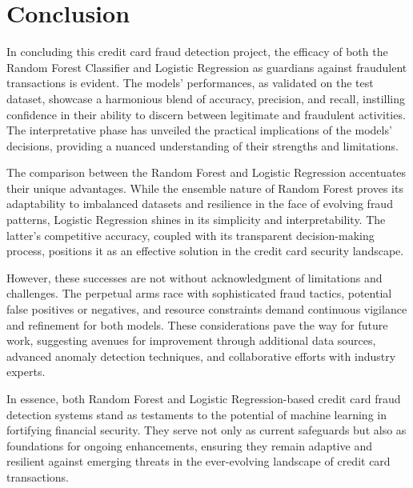 \let\cleardoublepage\clearpage
\chapter{Conclusion} %

\label{Chapter6} %

\newcommand{\keyword}[1]{\textbf{#1}}
\newcommand{\tabhead}[1]{\textbf{#1}}
\newcommand{\code}[1]{\texttt{#1}}
\newcommand{\file}[1]{\texttt{\bfseries#1}}
\newcommand{\option}[1]{\texttt{\itshape#1}}

In concluding this credit card fraud detection project, the efficacy of both the Random Forest Classifier and Logistic Regression as guardians against fraudulent transactions is evident. The models' performances, as validated on the test dataset, showcase a harmonious blend of accuracy, precision, and recall, instilling confidence in their ability to discern between legitimate and fraudulent activities. The interpretative phase has unveiled the practical implications of the models' decisions, providing a nuanced understanding of their strengths and limitations.\medskip

The comparison between the Random Forest and Logistic Regression accentuates their unique advantages. While the ensemble nature of Random Forest proves its adaptability to imbalanced datasets and resilience in the face of evolving fraud patterns, Logistic Regression shines in its simplicity and interpretability. The latter's competitive accuracy, coupled with its transparent decision-making process, positions it as an effective solution in the credit card security landscape.\medskip

However, these successes are not without acknowledgment of limitations and challenges. The perpetual arms race with sophisticated fraud tactics, potential false positives or negatives, and resource constraints demand continuous vigilance and refinement for both models. These considerations pave the way for future work, suggesting avenues for improvement through additional data sources, advanced anomaly detection techniques, and collaborative efforts with industry experts.\medskip

In essence, both Random Forest and Logistic Regression-based credit card fraud detection systems stand as testaments to the potential of machine learning in fortifying financial security. They serve not only as current safeguards but also as foundations for ongoing enhancements, ensuring they remain adaptive and resilient against emerging threats in the ever-evolving landscape of credit card transactions.